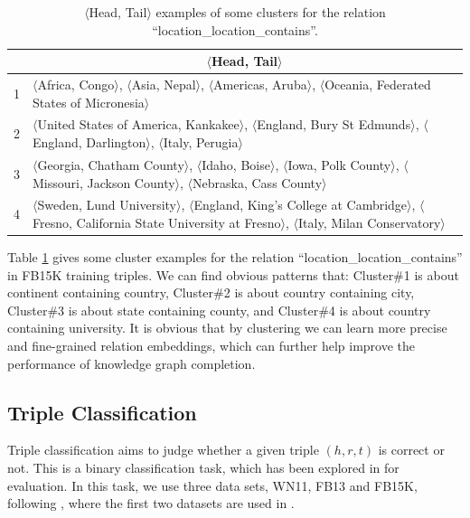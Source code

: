     \begin{table}[htb]
    \small
    \centering
    \caption{$\langle$Head, Tail$\rangle$ examples of some clusters for the relation ``location\_location\_contains''.}
     \label{label:cluster_example}
    \begin{tabular}{|c|p{}|}
    \hline
    & \multicolumn{1}{|c|}{$\langle$Head, Tail$\rangle$} \\
    \hline
    1 & $\langle$Africa, Congo$\rangle$, $\langle$Asia, Nepal$\rangle$, $\langle$Americas, Aruba$\rangle$,  $\langle$Oceania, Federated States of Micronesia$\rangle$
    \\ \hline
    2 & $\langle$United States of America, Kankakee$\rangle$,
    $\langle$England, Bury St Edmunds$\rangle$,
    $\langle$England, Darlington$\rangle$, $\langle$Italy, Perugia$\rangle$ \\ \hline
    3 & $\langle$Georgia, Chatham County$\rangle$, $\langle$Idaho, Boise$\rangle$, $\langle$Iowa, Polk County$\rangle$, $\langle$Missouri, Jackson County$\rangle$, $\langle$Nebraska, Cass County$\rangle$
    \\ \hline
    4 & $\langle$Sweden, Lund University$\rangle$, $\langle$England, King's College at Cambridge$\rangle$, $\langle$Fresno, California State University at Fresno$\rangle$, $\langle$Italy, Milan Conservatory$\rangle$
    \\\hline
    \end{tabular}
    \end{table}

    Table \ref{label:cluster_example} gives some cluster examples for the relation ``location\_location\_contains'' in FB15K training triples. We can find obvious patterns that: Cluster\#1 is about continent containing country, Cluster\#2 is about country containing city, Cluster\#3 is about state containing county, and Cluster\#4 is about country containing university. It is obvious that by clustering we can learn more precise and fine-grained relation embeddings, which can further help improve the performance of  knowledge graph completion.

    \subsection{Triple Classification}
    Triple classification aims to judge whether a given triple $(h, r, t)$ is correct or not. This is a binary classification task, which has been explored in  for evaluation. In this task, we use three data sets, WN11, FB13 and FB15K, following , where the first two datasets are used in .

